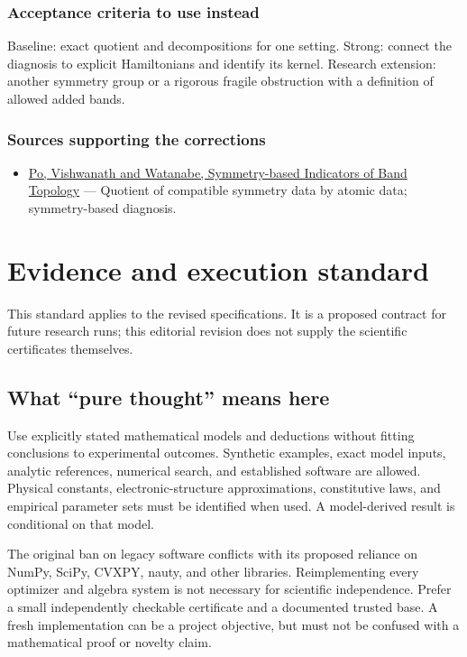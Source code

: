 \documentclass[
  11pt,
]{article}
\providecommand{\tightlist}{%
  \setlength{\itemsep}{0pt}\setlength{\parskip}{0pt}}
\begin{document}
\subsubsection{Acceptance criteria to use instead}

Baseline: exact quotient and decompositions for one setting. Strong:
connect the diagnosis to explicit Hamiltonians and identify its kernel.
Research extension: another symmetry group or a rigorous fragile
obstruction with a definition of allowed added bands.

\subsubsection{Sources supporting the corrections}

\begin{itemize}
\tightlist
\item
  \href{https://arxiv.org/abs/1703.00911}{Po, Vishwanath and Watanabe,
  Symmetry-based Indicators of Band Topology} --- Quotient of compatible
  symmetry data by atomic data; symmetry-based diagnosis.
\end{itemize}

\section{Evidence and execution standard}

This standard applies to the revised specifications. It is a proposed
contract for future research runs; this editorial revision does not
supply the scientific certificates themselves.

\subsection{What ``pure thought'' means here}

Use explicitly stated mathematical models and deductions without fitting
conclusions to experimental outcomes. Synthetic examples, exact model
inputs, analytic references, numerical search, and established software
are allowed. Physical constants, electronic-structure approximations,
constitutive laws, and empirical parameter sets must be identified when
used. A model-derived result is conditional on that model.

The original ban on legacy software conflicts with its proposed reliance
on NumPy, SciPy, CVXPY, nauty, and other libraries. Reimplementing every
optimizer and algebra system is not necessary for scientific
independence. Prefer a small independently checkable certificate and a
documented trusted base. A fresh implementation can be a project
objective, but must not be confused with a mathematical proof or novelty
claim.
\end{document}
